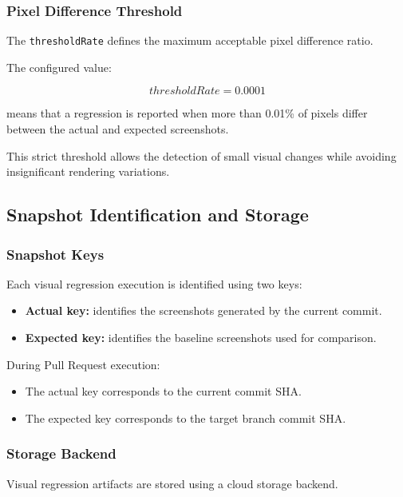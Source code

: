 \subsubsection{Pixel Difference Threshold}

The \texttt{thresholdRate} defines the maximum acceptable pixel difference ratio.

The configured value:

\[
thresholdRate = 0.0001
\]

means that a regression is reported when more than 0.01\% of pixels differ between the actual and expected screenshots.

This strict threshold allows the detection of small visual changes while avoiding insignificant rendering variations.


\subsection{Snapshot Identification and Storage}

\subsubsection{Snapshot Keys}

Each visual regression execution is identified using two keys:

\begin{itemize}
    \item \textbf{Actual key:} identifies the screenshots generated by the current commit.
    \item \textbf{Expected key:} identifies the baseline screenshots used for comparison.
\end{itemize}

During Pull Request execution:

\begin{itemize}
    \item The actual key corresponds to the current commit SHA.
    \item The expected key corresponds to the target branch commit SHA.
\end{itemize}


\subsubsection{Storage Backend}

Visual regression artifacts are stored using a cloud storage backend.

